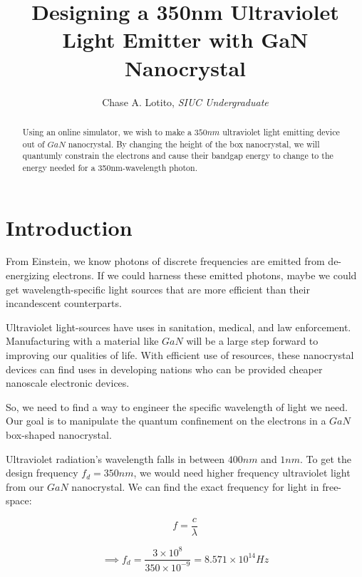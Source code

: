 \documentclass{IEEEtran}
\title{Designing a 350nm Ultraviolet Light Emitter with GaN Nanocrystal}
\author{Chase A. Lotito, \textit{SIUC Undergraduate}}
\date{}
\begin{document}
\maketitle %

\begin{abstract}

    Using an online simulator, we wish to make a \(350nm\) ultraviolet light emitting device out of \(GaN\) nanocrystal. By changing the height of the box nanocrystal, we will quantumly constrain the electrons and cause their bandgap energy to change to the energy needed for a 350nm-wavelength photon.   

\end{abstract}

\section{Introduction}

From Einstein, we know photons of discrete frequencies are emitted from de-energizing electrons. If we could harness these emitted photons, maybe we could get wavelength-specific light sources that are more efficient than their incandescent counterparts.

Ultraviolet light-sources have uses in sanitation, medical, and law enforcement. Manufacturing with a material like $GaN$ will be a large step forward to improving our qualities of life. With efficient use of resources, these nanocrystal devices can find uses in developing nations who can be provided cheaper nanoscale electronic devices.

So, we need to find a way to engineer the specific wavelength of light we need. Our goal is to manipulate the quantum confinement on the electrons in a \(GaN\) box-shaped nanocrystal.


Ultraviolet radiation's wavelength falls in between \(400nm\) and \(1nm\). To get the design frequency \(f_d = 350nm\), we would need higher frequency ultraviolet light from our \(GaN\) nanocrystal. We can find the exact frequency for light in free-space:

\begin{equation}
    f = \frac{c}{\lambda}
\end{equation}

\begin{equation*}
    \implies f_d = \frac{3 \times 10^8}{350 \times 10^{-9}} = 8.571 \times 10^{14} Hz
\end{equation*}
\end{document}
